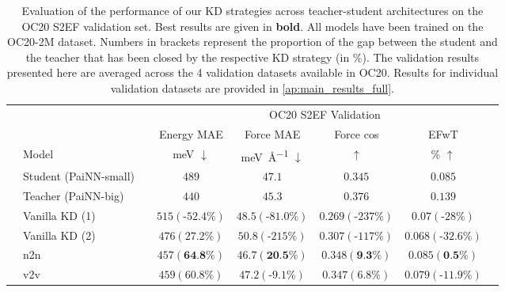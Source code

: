 \documentclass{article}
\begin{document}
\begin{table}
\centering
\caption{Evaluation of the performance of our KD strategies across teacher-student architectures on the OC20 S2EF validation set. Best results are given in \textbf{bold}. All models have been trained on the OC20-2M dataset. Numbers in brackets represent the proportion of the gap between the student and the teacher that has been closed by the respective KD strategy (in \%). The validation results presented here are averaged across the 4 validation datasets available in OC20. Results for individual validation datasets are provided in \cref{ap:main_results_full}. }
\begin{tabular}{llcccccc}
\multicolumn{1}{c}{\multirow{3}{*}{}} & & & \multicolumn{5}{c}{OC20 S2EF Validation} 
\\\cmidrule(r){4-7}
\multicolumn{1}{c}{}   &   &                   &      Energy MAE  &    Force MAE  & Force cos & EFwT \\
&   \multicolumn{1}{l}{Model}     &        &      \si{\milli\electronvolt} $\downarrow$   &    \si{\milli\electronvolt\per\angstrom} $\downarrow$     & $\uparrow$  & \% $\uparrow$ \\\cmidrule(r){1-7}
\parbox[t]{2mm}{} & Student (PaiNN-small)               &   &              $489$      &     $47.1$     &  $0.345$ &  $0.085$  \\
& Teacher (PaiNN-big)              &  &          $440$        &   $45.3$     &   $0.376$      &   $0.139$  \\
& Vanilla KD (1)         &   &            $515 (\text{-}52.4\%)$          &          $48.5 (\text{-}81.0\%)$     &     $0.269 (\text{-}237\%)$        &  $0.07 (\text{-}28\%)$   \\
& Vanilla KD (2)         &   &                $476 (27.2\%)$      &          $50.8 (\text{-}215\%)$     &     $0.307 (\text{-}117\%)$        &   $0.068 (\text{-}32.6\%)$ \\
& n2n              &   &             $457 (\textbf{64.8\%})$         &          $46.7 (\textbf{20.5\%})$     &     $0.348 (\textbf{9.3\%})$        & $0.085 (\textbf{0.5\%})$    \\
& v2v                &   &          $459 (60.8\%)$            &          $47.2 (\text{-}9.1\%)$     &     $0.347 (6.8\%)$        & $0.079 (\text{-}11.9\%)$    \\

\end{tabular}
\end{table}
\end{document}
